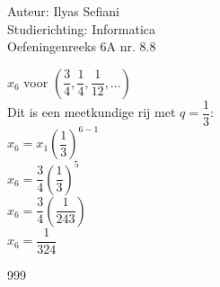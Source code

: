 \documentclass[a4paper]{article}
\begin{document}
\noindent \large Auteur: Ilyas Sefiani \\
\noindent \large Studierichting: Informatica\\
\noindent \large Oefeningenreeks 6A nr. 8.8\\

\medskip

\normalsize
$x_{6}$ voor $\left(\dfrac{3}{4},\dfrac{1}{4},\dfrac{1}{12},...\right)$\\

Dit is een meetkundige rij met $q=\dfrac{1}{3}$:\\

$x_{6}= x_1\left(\dfrac{1}{3}\right)^{6-1}$\\

$x_{6}= \dfrac{3}{4}\left(\dfrac{1}{3}\right)^{5}$\\

$x_{6}= \dfrac{3}{4}\left(\dfrac{1}{243}\right)$\\

$x_{6}= \dfrac{1}{324}$\\

\begin{thebibliography}{999}
\end{thebibliography}
\end{document}
